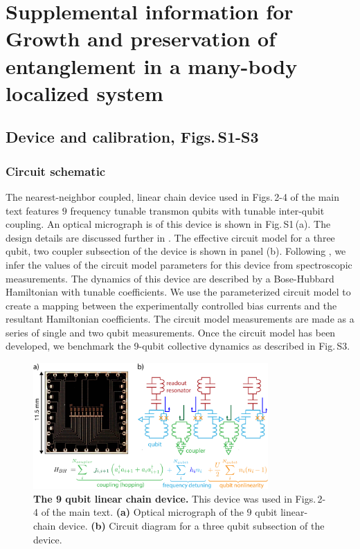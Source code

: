 \chapter[MBL supp]{Supplemental information for Growth and preservation of entanglement in a many-body localized system}

\section{Device and calibration, Figs.\,S1-S3}

\subsection{Circuit schematic}
The nearest-neighbor coupled, linear chain device used in Figs.\,2-4 of the main text features $9$ frequency tunable transmon qubits with tunable inter-qubit coupling.
An optical micrograph is of this device is shown in Fig.\,S1\,(a).
The design details are discussed further in \cite{Neill2018}.
The effective circuit model for a three qubit, two coupler subsection of the device is shown in panel (b).
Following \cite{Neill2018}, we infer the values of the circuit model parameters for this device from spectroscopic measurements.
The dynamics of this device are described by a Bose-Hubbard Hamiltonian with tunable coefficients.
We use the parameterized circuit model to create a mapping between the experimentally controlled bias currents and the resultant Hamiltonian coefficients.
The circuit model measurements are made as a series of single and two qubit measurements.
Once the circuit model has been developed, we benchmark the 9-qubit collective dynamics as described in Fig.\,S3.
\begin{figure}[h]
\centering
\includegraphics[width=0.80\textwidth, keepaspectratio]{./PDF/fs1_190916_1029a.pdf}
\caption{\textbf{The 9 qubit linear chain device.} This device was used in Figs.\,2-4 of the main text.
\textbf{(a)} Optical micrograph of the $9$ qubit linear-chain device.
\textbf{(b)} Circuit diagram for a three qubit subsection of the device.}
\end{figure}

